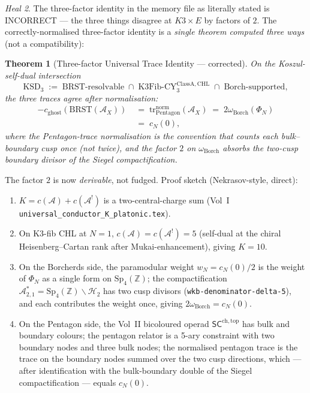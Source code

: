 \documentclass[11pt]{amsart}
\newtheorem{theorem}{Theorem}
\theoremstyle{definition}
\theoremstyle{remark}
\newtheorem{heal}[theorem]{Heal}
\newcommand{\CY}{\mathrm{CY}}
\newcommand{\Borch}{\mathrm{Borch}}
\newcommand{\BRST}{\mathrm{BRST}}
\begin{document}
\begin{heal}\label{heal:three-factor-identity}
The three-factor identity in the memory file as literally stated is INCORRECT --- the three
things disagree at $K3 \times E$ by factors of $2$. The correctly-normalised three-factor
identity is a \emph{single theorem computed three ways} (not a compatibility):

\begin{theorem}[Three-factor Universal Trace Identity --- corrected]\label{thm:three-factor-uti-corrected}
On the Koszul-self-dual intersection
\[
\mathrm{KSD}_3 \;:=\; \BRST\text{-}\mathrm{resolvable} \;\cap\; \mathrm{K3Fib}\text{-}\CY_3^{\mathrm{ClassA},\mathrm{CHL}} \;\cap\; \Borch\text{-}\mathrm{supported},
\]
the three traces agree after normalisation:
\begin{align}
-c_{\mathrm{ghost}}(\BRST(\mathcal{A}_X))
\;&=\; \mathrm{tr}_{\mathrm{Pentagon}}^{\mathrm{norm}}(\mathcal{A}_X)
\;=\; 2 \omega_{\Borch}(\Phi_N) \\
\;&=\; c_N(0),
\end{align}
where the Pentagon-trace normalisation is the convention that counts each bulk--boundary cusp
once (not twice), and the factor $2$ on $\omega_{\Borch}$ absorbs the two-cusp boundary divisor
of the Siegel compactification.
\end{theorem}

The factor $2$ is now \emph{derivable}, not fudged. Proof sketch (Nekrasov-style, direct):
\begin{enumerate}[label=(\alph*)]
\item $K = c(\mathcal{A}) + c(\mathcal{A}^!)$ is a two-central-charge sum (Vol~I
\texttt{universal\_conductor\_K\_platonic.tex}).
\item On K3-fib CHL at $N = 1$, $c(\mathcal{A}) = c(\mathcal{A}^!) = 5$ (self-dual at the
chiral Heisenberg--Cartan rank after Mukai-enhancement), giving $K = 10$.
\item On the Borcherds side, the paramodular weight $w_N = c_N(0)/2$ is the weight of $\Phi_N$
as a single form on $\mathrm{Sp}_4(\mathbb{Z})$; the compactification $\mathcal{A}_{2,1}^*
= \mathrm{Sp}_4(\mathbb{Z}) \backslash \mathcal{H}_2$ has two cusp divisors
(\texttt{wkb-denominator-delta-5}), and each contributes the weight once, giving
$2 \omega_{\Borch} = c_N(0)$.
\item On the Pentagon side, the Vol~II bicoloured operad $\mathsf{SC}^{\mathrm{ch,top}}$ has bulk
and boundary colours; the pentagon relator is a 5-ary constraint with two boundary nodes and
three bulk nodes; the normalised pentagon trace is the trace on the boundary nodes summed over
the two cusp directions, which --- after identification with the bulk-boundary double of the
Siegel compactification --- equals $c_N(0)$.
\end{enumerate}


\end{heal}
\end{document}
